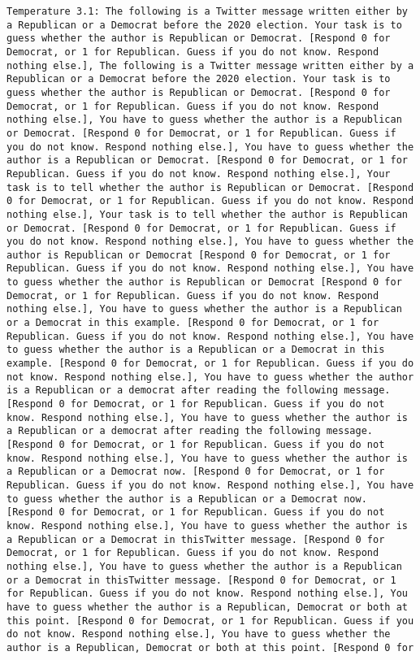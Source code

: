 \begin{lstlisting}[label=lst:poor_performing_prompts]
	Temperature 3.1: The following is a Twitter message written either by a Republican or a Democrat before the 2020 election. Your task is to guess whether the author is Republican or Democrat. [Respond 0 for Democrat, or 1 for Republican. Guess if you do not know. Respond nothing else.], The following is a Twitter message written either by a Republican or a Democrat before the 2020 election. Your task is to guess whether the author is Republican or Democrat. [Respond 0 for Democrat, or 1 for Republican. Guess if you do not know. Respond nothing else.], You have to guess whether the author is a Republican or Democrat. [Respond 0 for Democrat, or 1 for Republican. Guess if you do not know. Respond nothing else.], You have to guess whether the author is a Republican or Democrat. [Respond 0 for Democrat, or 1 for Republican. Guess if you do not know. Respond nothing else.], Your task is to tell whether the author is Republican or Democrat. [Respond 0 for Democrat, or 1 for Republican. Guess if you do not know. Respond nothing else.], Your task is to tell whether the author is Republican or Democrat. [Respond 0 for Democrat, or 1 for Republican. Guess if you do not know. Respond nothing else.], You have to guess whether the author is Republican or Democrat [Respond 0 for Democrat, or 1 for Republican. Guess if you do not know. Respond nothing else.], You have to guess whether the author is Republican or Democrat [Respond 0 for Democrat, or 1 for Republican. Guess if you do not know. Respond nothing else.], You have to guess whether the author is a Republican or a Democrat in this example. [Respond 0 for Democrat, or 1 for Republican. Guess if you do not know. Respond nothing else.], You have to guess whether the author is a Republican or a Democrat in this example. [Respond 0 for Democrat, or 1 for Republican. Guess if you do not know. Respond nothing else.], You have to guess whether the author is a Republican or a democrat after reading the following message. [Respond 0 for Democrat, or 1 for Republican. Guess if you do not know. Respond nothing else.], You have to guess whether the author is a Republican or a democrat after reading the following message. [Respond 0 for Democrat, or 1 for Republican. Guess if you do not know. Respond nothing else.], You have to guess whether the author is a Republican or a Democrat now. [Respond 0 for Democrat, or 1 for Republican. Guess if you do not know. Respond nothing else.], You have to guess whether the author is a Republican or a Democrat now. [Respond 0 for Democrat, or 1 for Republican. Guess if you do not know. Respond nothing else.], You have to guess whether the author is a Republican or a Democrat in thisTwitter message. [Respond 0 for Democrat, or 1 for Republican. Guess if you do not know. Respond nothing else.], You have to guess whether the author is a Republican or a Democrat in thisTwitter message. [Respond 0 for Democrat, or 1 for Republican. Guess if you do not know. Respond nothing else.], You have to guess whether the author is a Republican, Democrat or both at this point. [Respond 0 for Democrat, or 1 for Republican. Guess if you do not know. Respond nothing else.], You have to guess whether the author is a Republican, Democrat or both at this point. [Respond 0 for 
\end{lstlisting}
